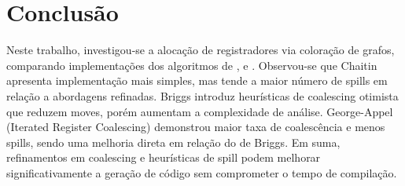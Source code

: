 \section{Conclusão}

Neste trabalho, investigou-se a alocação de registradores via coloração de grafos, comparando
implementações dos algoritmos de \textcite{chaitin}, \textcite{briggs} e \textcite{irc}.  
Observou-se que Chaitin apresenta implementação mais simples, mas tende a maior número
de spills em relação a abordagens refinadas.  
Briggs introduz heurísticas de coalescing otimista que reduzem moves, porém aumentam
a complexidade de análise.  
George-Appel (Iterated Register Coalescing) demonstrou maior taxa de coalescência e menos spills,
sendo uma melhoria direta em relação do de Briggs.  
Em suma, refinamentos em coalescing e heurísticas de spill podem melhorar significativamente a geração de código
sem comprometer o tempo de compilação.

